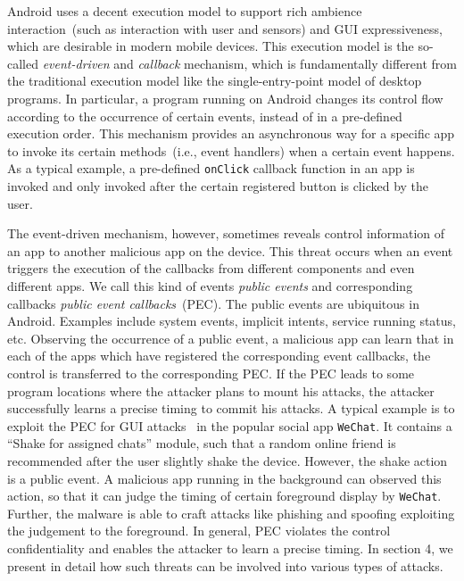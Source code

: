 Android uses a decent execution model to support rich ambience interaction~(such as interaction with user and sensors) and GUI expressiveness, 
which are desirable in modern mobile devices. 
This execution model is the so-called \emph{event-driven} and \emph{callback} mechanism, 
which is fundamentally different from the traditional execution model like the single-entry-point model of desktop programs. 
In particular, a program running on Android changes its control flow according to the occurrence of certain events, instead of in a pre-defined execution order. 
This mechanism provides an asynchronous way for a specific app to invoke its certain methods~(i.e., event handlers) when a certain event happens. 
As a typical example, a pre-defined \texttt{onClick} callback function in an app is invoked and only invoked after the certain registered button is clicked by the user. 

The event-driven mechanism, however, sometimes reveals control information of an app to another malicious app on the device. 
This threat occurs when an event triggers the execution of the callbacks from different components and even different apps. 
We call this kind of events \emph{public events}  
and corresponding callbacks \emph{public event callbacks}~(PEC). 
The public events are ubiquitous in Android. Examples 
include system events, implicit intents, service running status, etc. 
Observing the occurrence of a public event, 
a malicious app can learn that in each of the apps which have registered the corresponding event callbacks, 
the control is transferred to the corresponding PEC. 
If the PEC leads to some program locations where the attacker plans to mount his attacks, 
the attacker successfully learns a precise timing to commit his attacks. 
A typical example is to exploit the PEC for GUI attacks~\cite{chen2014peeking,bianchi2015app,ren2015towards} in the popular social app \texttt{WeChat}. 
It contains a ``Shake for assigned chats'' module, such that 
a random online friend is recommended after the user slightly shake the device. 
However, the shake action is a public event. 
A malicious app running in the background can observed this action, so that it can judge the timing of certain foreground display by \texttt{WeChat}. 
Further, the malware is able to craft attacks like phishing and spoofing exploiting the judgement to the foreground. 
In general, PEC violates the control confidentiality and enables the attacker to learn a precise timing. 
In section 4, we present in detail how such threats can be involved into various types of attacks. 


